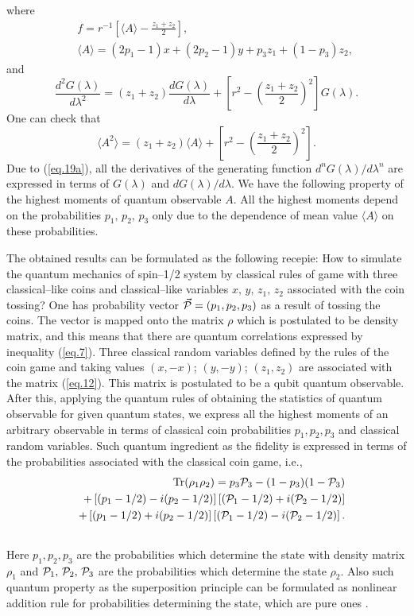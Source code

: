 \documentclass[12pt]{article}
\begin{document}
where 
\begin{eqnarray}%
&&f=r^{-1}\left[\langle A\rangle-\frac{z_1+z_2}{2}\right],\nonumber\\
&&\langle A\rangle=(2 p_1-1)x+(2p_2-1)y+p_3z_1+(1-p_3)z_2, \label{eq.18a}
\end{eqnarray}
and
\begin{equation}\label{eq.19a}
\frac{d^2G(\lambda)}{d\lambda^2}=(z_1+z_2)\frac{d G(\lambda)}{d\lambda}+\left[r^2-\left(\frac{z_1+z_2}{2}\right)^2\right]G(\lambda).
\end{equation}
One can check that
\begin{equation}\label{eq.20}
\langle A^2\rangle=(z_1+z_2)\langle A\rangle+\left[r^2-\left(\frac{z_1+z_2}{2}\right)^2\right].
\end{equation}
Due to (\ref{eq.19a}), all the derivatives of the generating function $%
d^n G(\lambda)/d \lambda^n$ are expressed in terms of $G(\lambda)$ and $d G(\lambda)/d\lambda.$ 
We have the following property of the highest moments of quantum observable $A$. All the highest moments depend on the probabilities $p_1,\,p_2,\,p_3$ only due to the dependence of mean value $\langle A\rangle$ on these probabilities.

The obtained results can be formulated as the following recepie: How to simulate the quantum mechanics of spin--1/2 system by classical rules of game with three classical--like coins and classical--like variables $x,\,y,\,z_1,\,z_2$ associated with the coin tossing? One has probability vector $\vec{\cal P}=(p_1,p_2,p_3)$ as a result of tossing the coins. The vector is mapped onto the matrix $\rho$ which is postulated to be density matrix, and this means that there are quantum correlations expressed by inequality (\ref{eq.7}). Three classical random variables defined by the rules of the coin game and taking values $(x,-x);\,(y,-y);\,(z_1,z_2)$ are associated with the matrix (\ref{eq.12}). This matrix is postulated to be a qubit quantum observable. After this, applying the quantum rules of obtaining the statistics of quantum observable for given quantum states, we express all the highest moments of an arbitrary observable in terms of classical coin probabilities $p_1,p_2,p_3$ and classical random variables. Such quantum ingredient as the fidelity is expressed in terms of the probabilities associated with the classical coin game, i.e.,  
\begin{eqnarray}%
&&\mbox{Tr}(\rho_1\rho_2)=p_3{\cal P}_3- (1-p_3)(1-{\cal P}_3)\nonumber\\
&&+\left[(p_1-1/2)-i(p_2-1/2)\right]\left[({\cal P}_1-1/2)+i({\cal P}_2-1/2)\right]\nonumber\\
&&+\left[(p_1-1/2)+i(p_2-1/2)\right]\left[({\cal P}_1-1/2)-i({\cal P}_2-1/2)\right].\nonumber\\
&&\label{eq.21}
\end{eqnarray}
Here  $p_1,p_2,p_3$ are the probabilities which determine the state with density matrix $\rho_1$ and ${\cal P}_1,\,{\cal P}_2,\,{\cal P}_3$ are the probabilities which determine the state $\rho_2$. Also such quantum property as the superposition principle can be formulated as nonlinear addition rule for probabilities determining the state, which are pure ones \cite{PhysScr2018,Cher22}. 
\end{document}
